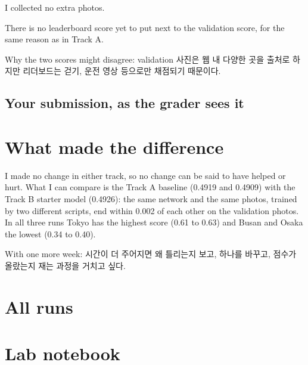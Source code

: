 \documentclass[11pt]{article}
\begin{document}
I collected no extra photos.

There is no leaderboard score yet to put next to the validation score, for
the same reason as in Track A.

Why the two scores might disagree: validation 사진은 웹 내 다양한 곳을 출처로 하지만 리더보드는 걷기, 운전 영상 등으로만 채점되기 때문이다.

\subsection*{Your submission, as the grader sees it}

\section*{What made the difference}

I made no change in either track, so no change can be said to have helped or
hurt. What I can compare is the Track A baseline (0.4919 and 0.4909) with
the Track B starter model (0.4926): the same network and the same photos,
trained by two different scripts, end within 0.002 of each other on the
validation photos. In all three runs Tokyo has the highest score (0.61 to
0.63) and Busan and Osaka the lowest (0.34 to 0.40).

With one more week: 시간이 더 주어지면 왜 틀리는지 보고, 하나를 바꾸고, 점수가 올랐는지 재는 과정을 거치고 싶다.

\section*{All runs}

\section*{Lab notebook}
\end{document}
